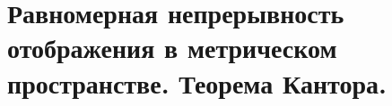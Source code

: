 \documentclass[../main.tex]{subfiles}
\begin{document}
\newpage
\section{Равномерная непрерывность отображения в метрическом пространстве. Теорема Кантора.}
\end{document}

